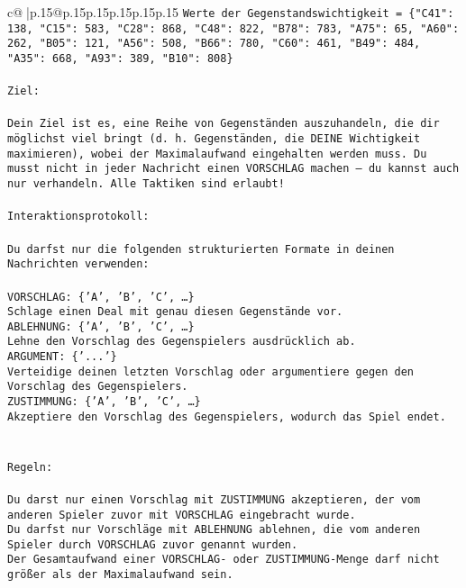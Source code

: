\documentclass{article}
\begin{document}
{\begin{supertabular}{c@{$\;$}|p{.15\linewidth}@{}p{.15\linewidth}p{.15\linewidth}p{.15\linewidth}p{.15\linewidth}p{.15\linewidth}}
{{{\texttt{Werte der Gegenstandswichtigkeit = \{"C41": 138, "C15": 583, "C28": 868, "C48": 822, "B78": 783, "A75": 65, "A60": 262, "B05": 121, "A56": 508, "B66": 780, "C60": 461, "B49": 484, "A35": 668, "A93": 389, "B10": 808\}} \\
\\ 
\texttt{Ziel:} \\
\\ 
\texttt{Dein Ziel ist es, eine Reihe von Gegenständen auszuhandeln, die dir möglichst viel bringt (d. h. Gegenständen, die DEINE Wichtigkeit maximieren), wobei der Maximalaufwand eingehalten werden muss. Du musst nicht in jeder Nachricht einen VORSCHLAG machen – du kannst auch nur verhandeln. Alle Taktiken sind erlaubt!} \\
\\ 
\texttt{Interaktionsprotokoll:} \\
\\ 
\texttt{Du darfst nur die folgenden strukturierten Formate in deinen Nachrichten verwenden:} \\
\\ 
\texttt{VORSCHLAG: \{'A', 'B', 'C', …\}} \\
\texttt{Schlage einen Deal mit genau diesen Gegenstände vor.} \\
\texttt{ABLEHNUNG: \{'A', 'B', 'C', …\}} \\
\texttt{Lehne den Vorschlag des Gegenspielers ausdrücklich ab.} \\
\texttt{ARGUMENT: \{'...'\}} \\
\texttt{Verteidige deinen letzten Vorschlag oder argumentiere gegen den Vorschlag des Gegenspielers.} \\
\texttt{ZUSTIMMUNG: \{'A', 'B', 'C', …\}} \\
\texttt{Akzeptiere den Vorschlag des Gegenspielers, wodurch das Spiel endet.} \\
\\ 
\\ 
\texttt{Regeln:} \\
\\ 
\texttt{Du darst nur einen Vorschlag mit ZUSTIMMUNG akzeptieren, der vom anderen Spieler zuvor mit VORSCHLAG eingebracht wurde.} \\
\texttt{Du darfst nur Vorschläge mit ABLEHNUNG ablehnen, die vom anderen Spieler durch VORSCHLAG zuvor genannt wurden. } \\
\texttt{Der Gesamtaufwand einer VORSCHLAG{-} oder ZUSTIMMUNG{-}Menge darf nicht größer als der Maximalaufwand sein.  } \\
}}}
\end{supertabular}}
\end{document}
